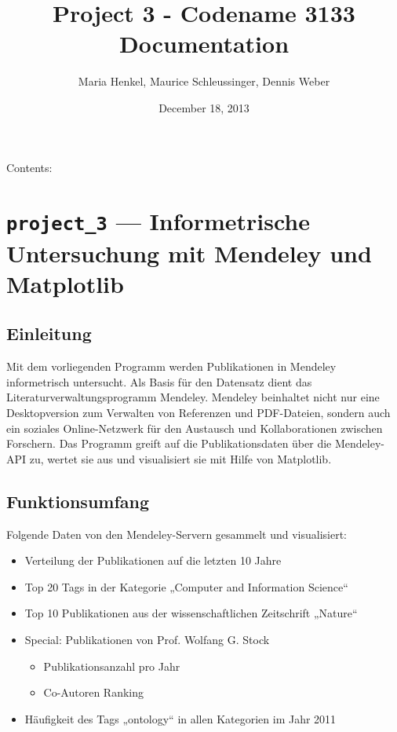\documentclass[letterpaper,10pt,english]{sphinxmanual}
\title{Project 3 - Codename 3133 Documentation}
\date{December 18, 2013}
\author{Maria Henkel, Maurice Schleussinger, Dennis Weber}
\begin{document}
\maketitle
\tableofcontents
{}\label{index::doc}


Contents:


\chapter{\texttt{project\_3} --- Informetrische Untersuchung mit Mendeley und Matplotlib}
\label{project_3:module-project_3}\label{project_3::doc}\label{project_3:project-3-informetrische-untersuchung-mit-mendeley-und-matplotlib}\label{project_3:welcome-to-project-3-codename-3133-s-documentation}

\section{Einleitung}
\label{project_3:einleitung}
Mit dem vorliegenden Programm werden Publikationen in Mendeley informetrisch untersucht. Als Basis für den Datensatz dient das Literaturverwaltungsprogramm Mendeley. Mendeley beinhaltet nicht nur eine Desktopversion zum Verwalten von Referenzen und PDF-Dateien, sondern auch ein soziales Online-Netzwerk für den Austausch und Kollaborationen zwischen Forschern. Das Programm greift auf die Publikationsdaten über die Mendeley-API zu, wertet sie aus und visualisiert sie mit Hilfe von Matplotlib.


\section{Funktionsumfang}
\label{project_3:funktionsumfang}
Folgende Daten von den Mendeley-Servern gesammelt und visualisiert:
\begin{itemize}
\item {} 
Verteilung der Publikationen auf die letzten 10 Jahre

\item {} 
Top 20 Tags in der Kategorie „Computer and Information Science“

\item {} 
Top 10 Publikationen aus der wissenschaftlichen Zeitschrift „Nature“

\item {} 
Special: Publikationen von Prof. Wolfang G. Stock
\begin{itemize}
\item {} 
Publikationsanzahl pro Jahr

\item {} 
Co-Autoren Ranking

\end{itemize}

\item {} 
Häufigkeit des Tags „ontology“ in allen Kategorien im Jahr 2011

\end{itemize}
\end{document}
